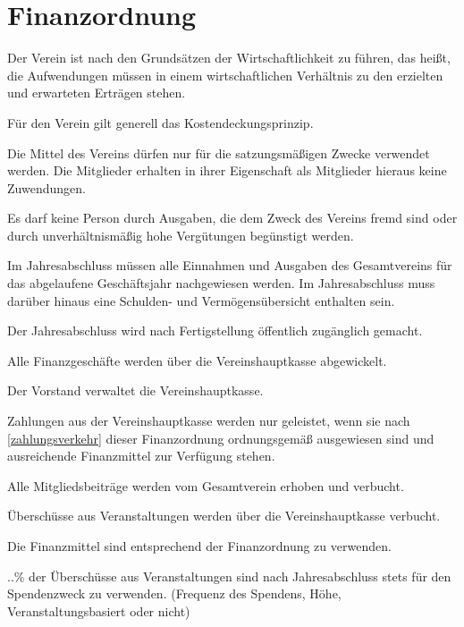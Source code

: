 \section{Finanzordnung}

\begin{finanz}


  Der Verein ist nach den Grundsätzen der Wirtschaftlichkeit zu führen, das heißt, die Aufwendungen müssen in einem wirtschaftlichen Verhältnis zu den erzielten und erwarteten Erträgen stehen.

  Für den Verein gilt generell das Kostendeckungsprinzip.

  Die Mittel des Vereins dürfen nur für die satzungsmäßigen Zwecke verwendet werden. Die Mitglieder erhalten in ihrer Eigenschaft als Mitglieder hieraus keine Zuwendungen.

  Es darf keine Person durch Ausgaben, die dem Zweck des Vereins fremd sind oder durch unverhältnismäßig hohe Vergütungen begünstigt werden.


  Im Jahresabschluss müssen alle Einnahmen und Ausgaben des Gesamtvereins für das abgelaufene Geschäftsjahr nachgewiesen werden. Im Jahresabschluss muss darüber hinaus eine Schulden- und Vermögensübersicht enthalten sein.

  Der Jahresabschluss wird nach Fertigstellung öffentlich zugänglich gemacht.


  Alle Finanzgeschäfte werden über die Vereinshauptkasse abgewickelt.

  Der Vorstand verwaltet die Vereinshauptkasse.

  Zahlungen aus der Vereinshauptkasse werden nur geleistet, wenn sie nach \ref{zahlungsverkehr} dieser Finanzordnung ordnungsgemäß ausgewiesen sind und ausreichende Finanzmittel zur Verfügung stehen.


  Alle Mitgliedsbeiträge werden vom Gesamtverein erhoben und verbucht.

  Überschüsse aus Veranstaltungen werden über die Vereinshauptkasse verbucht.

  Die Finanzmittel sind entsprechend der Finanzordnung zu verwenden.

  ..\% der Überschüsse aus Veranstaltungen sind nach Jahresabschluss stets für den Spendenzweck zu verwenden. (Frequenz des Spendens, Höhe, Veranstaltungsbasiert oder nicht)
  

\end{finanz}
